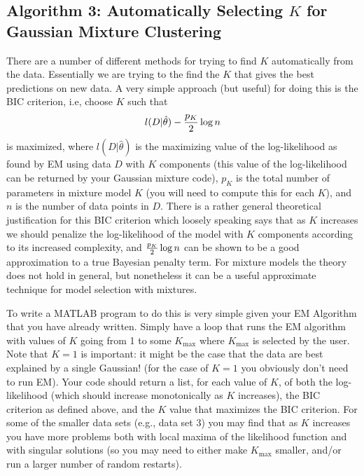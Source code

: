\documentclass[11pt,psfig]{article}
\begin{document}
\subsection*{Algorithm 3: Automatically Selecting $K$ for Gaussian Mixture Clustering}
There are a number of different methods for trying to find $K$ automatically
from the data. Essentially we are trying to the find the $K$ that gives the
best predictions on new data. A very simple  approach (but useful) for doing
this is   the BIC criterion, i.e, choose $K$ such that
\[
l(D|\hat{\theta}) - {{p_K}\over 2} \log n
\]
is maximized, where $l(D|\hat{\theta})$ is the maximizing value of the
log-likelihood as found by EM using data $D$ with $K$ components (this value of
the log-likelihood can be returned by your Gaussian mixture code), $p_K$ is the
total number of parameters in mixture model $K$ (you will need to compute this
for each $K$), and  $n$ is the number of data points in $D$. There is a rather
general theoretical justification for this BIC criterion which loosely speaking
says that as $K$ increases we should penalize the log-likelihood of the model
with $K$ components according to its increased complexity, and ${{p_K}\over 2}
\log n$ can be shown to be a good approximation to a true Bayesian penalty
term. For mixture models the theory does not hold in general, but nonetheless
it can be a useful approximate technique for model selection with mixtures.

To write a MATLAB program to do this is very simple given
your EM Algorithm  that you have
already written. Simply have a loop that runs the EM
algorithm with values of $K$ going from 1 to some $K_{\max}$
where $K_{\max}$ is selected by the user. Note that
$K=1$ is important: it might be the case that the data
are best explained by a single Gaussian! (for the case
of $K=1$ you obviously don't need to run EM). Your
code should return a list, for each value of $K$,
of both the log-likelihood (which should increase
monotonically as $K$ increases), the BIC criterion
as defined above, and the $K$ value that maximizes
the BIC criterion. For some of the smaller
data sets (e.g., data set 3) you may find
that as $K$ increases you have more problems both
with local maxima of the likelihood function and with
singular solutions (so you may need to either
make $K_{\max}$ smaller, and/or run a larger number of
random restarts).
\end{document}
